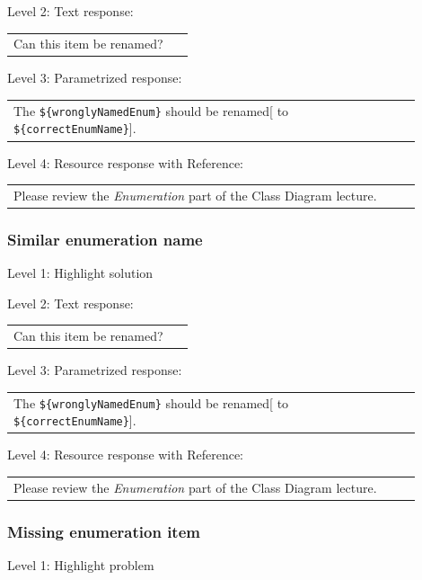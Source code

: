 \noindent Level 2: Text response: \medskip

\begin{tabular}{|p{0.9\linewidth}}
Can this item be renamed?
\end{tabular} \medskip

\noindent Level 3: Parametrized response: \medskip

\begin{tabular}{|p{0.9\linewidth}}
The \verb|${wronglyNamedEnum}| should be renamed[ to \verb|${correctEnumName}|].
\end{tabular} \medskip

\noindent Level 4: Resource response with Reference: \medskip

\begin{tabular}{|p{0.9\linewidth}}
Please review the \textit{Enumeration} part of the Class Diagram lecture.
\end{tabular} \medskip


\subsubsection{Similar enumeration name}

\noindent Level 1: Highlight solution \medskip

\noindent Level 2: Text response: \medskip

\begin{tabular}{|p{0.9\linewidth}}
Can this item be renamed?
\end{tabular} \medskip

\noindent Level 3: Parametrized response: \medskip

\begin{tabular}{|p{0.9\linewidth}}
The \verb|${wronglyNamedEnum}| should be renamed[ to \verb|${correctEnumName}|].
\end{tabular} \medskip

\noindent Level 4: Resource response with Reference: \medskip

\begin{tabular}{|p{0.9\linewidth}}
Please review the \textit{Enumeration} part of the Class Diagram lecture.
\end{tabular} \medskip


\subsubsection{Missing enumeration item}

\noindent Level 1: Highlight problem \medskip

